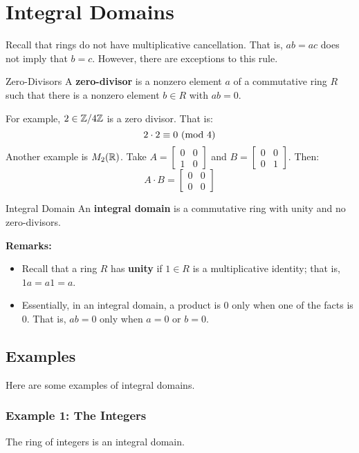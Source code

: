 \documentclass[letterpaper]{article}
\begin{document}
\section{Integral Domains}
Recall that rings do not have multiplicative cancellation. That is, $ab = ac$ does not imply that $b = c$. However, there are exceptions to this rule.

\begin{definition}{Zero-Divisors}{}
    A \textbf{zero-divisor} is a nonzero element $a$ of a commutative ring $R$ such that there is a nonzero element $b \in R$ with $ab = 0$. 
\end{definition}
For example, $2 \in \mathbb{Z} / 4 \mathbb{Z}$ is a zero divisor. That is: 
\[2 \cdot 2 \equiv 0 \ (\mathrm{mod}\ 4)\]
Another example is $M_{2}(\mathbb{R})$. Take $A = \begin{bmatrix}
    0 & 0 \\ 1 & 0 
\end{bmatrix}$ and $B = \begin{bmatrix}
    0 & 0 \\ 0 & 1
\end{bmatrix}$. Then:
\[A \cdot B = \begin{bmatrix}
    0 & 0 \\ 0 & 0
\end{bmatrix}\] 

\begin{definition}{Integral Domain}{}
    An \textbf{integral domain} is a commutative ring with unity and no zero-divisors.
\end{definition}
\textbf{Remarks:}
\begin{itemize}
    \item Recall that a ring $R$ has \textbf{unity} if $1 \in R$ is a multiplicative identity; that is, $1a = a1 = a$. 
    \item Essentially, in an integral domain, a product is 0 only when one of the facts is 0. That is, $ab = 0$ only when $a = 0$ or $b = 0$. 
\end{itemize}

\subsection{Examples}
Here are some examples of integral domains. 

\subsubsection{Example 1: The Integers}
The ring of integers is an integral domain. 
\end{document}
